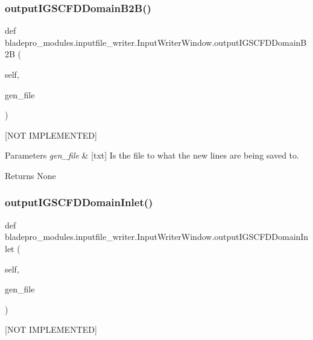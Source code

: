 \subsubsection{\texorpdfstring{output\+I\+G\+S\+C\+F\+D\+Domain\+B2\+B()}{outputIGSCFDDomainB2B()}}
{\footnotesize\ttfamily def bladepro\+\_\+modules.\+inputfile\+\_\+writer.\+Input\+Writer\+Window.\+output\+I\+G\+S\+C\+F\+D\+Domain\+B2B (\begin{DoxyParamCaption}\item[{}]{self,  }\item[{}]{gen\+\_\+file }\end{DoxyParamCaption})}



\mbox{[}N\+OT I\+M\+P\+L\+E\+M\+E\+N\+T\+ED\mbox{]} 


\begin{DoxyParams}{Parameters}
{\em gen\+\_\+file} & \mbox{[}txt\mbox{]} Is the file to what the new lines are being saved to. \\
\hline
\end{DoxyParams}
\begin{DoxyReturn}{Returns}
None 
\end{DoxyReturn}
\hypertarget{a00073_a1a577ed1880def26fc13d02701e9346a}{}\label{a00073_a1a577ed1880def26fc13d02701e9346a} 
\subsubsection{\texorpdfstring{output\+I\+G\+S\+C\+F\+D\+Domain\+Inlet()}{outputIGSCFDDomainInlet()}}
{\footnotesize\ttfamily def bladepro\+\_\+modules.\+inputfile\+\_\+writer.\+Input\+Writer\+Window.\+output\+I\+G\+S\+C\+F\+D\+Domain\+Inlet (\begin{DoxyParamCaption}\item[{}]{self,  }\item[{}]{gen\+\_\+file }\end{DoxyParamCaption})}



\mbox{[}N\+OT I\+M\+P\+L\+E\+M\+E\+N\+T\+ED\mbox{]} 


